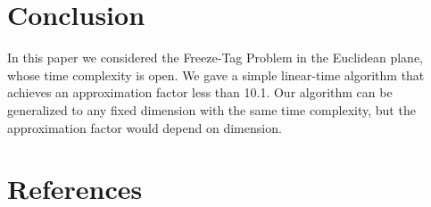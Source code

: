 \documentclass[review]{elsarticle}
\begin{document}
\section{Conclusion}
In this paper we considered the Freeze-Tag Problem in the Euclidean plane, whose time complexity is open. We gave a simple linear-time algorithm that achieves an approximation factor less than 10.1. Our algorithm can be generalized to any fixed dimension with the same time complexity, but the approximation factor would depend on dimension.

\section*{References}


\end{document}
